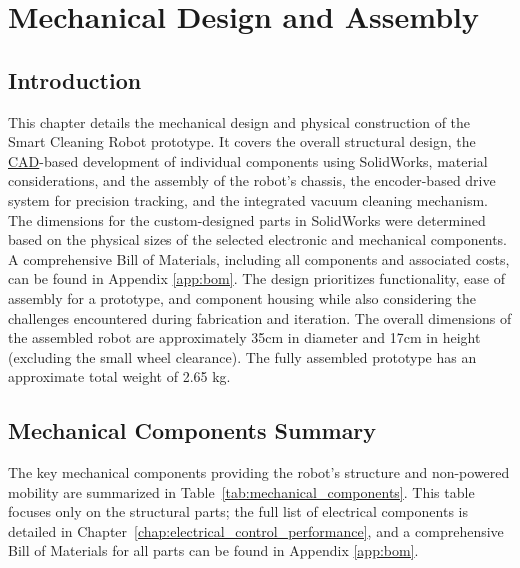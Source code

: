 \chapter{Mechanical Design and Assembly}
\label{chap:mechanical_design_assembly}

\section{Introduction}
\label{sec:mech_intro}
This chapter details the mechanical design and physical construction of the Smart Cleaning Robot prototype. It covers the overall structural design, the \hyperref[term:cad]{CAD}-based development of individual components using SolidWorks, material considerations, and the assembly of the robot's chassis, the encoder-based drive system for precision tracking, and the integrated vacuum cleaning mechanism. The dimensions for the custom-designed parts in SolidWorks were determined based on the physical sizes of the selected electronic and mechanical components. A comprehensive Bill of Materials, including all components and associated costs, can be found in Appendix \ref{app:bom}.
The design prioritizes functionality, ease of assembly for a prototype, and component housing while also considering the challenges encountered during fabrication and iteration.
The overall dimensions of the assembled robot are approximately 35cm in diameter and 17cm in height (excluding the small wheel clearance). The fully assembled prototype has an approximate total weight of 2.65 kg.

\section{Mechanical Components Summary}
The key mechanical components providing the robot's structure and non-powered mobility are summarized in Table~\ref{tab:mechanical_components}. This table focuses only on the structural parts; the full list of electrical components is detailed in Chapter~\ref{chap:electrical_control_performance}, and a comprehensive Bill of Materials for all parts can be found in Appendix \ref{app:bom}.

